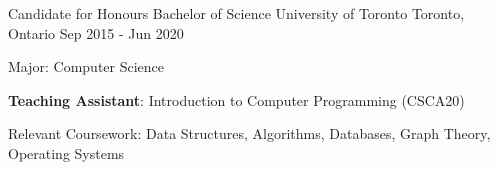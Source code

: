 
\begin{cventries}
  \cventry
    {Candidate for Honours Bachelor of Science}
    {University of Toronto}
    {Toronto, Ontario}
    {Sep 2015 - Jun 2020}
    {
      \begin{cvitems}
        \item {Major: Computer Science}
        \item {\textbf{Teaching Assistant}: Introduction to Computer Programming (CSCA20)}
        \item {Relevant Coursework: Data Structures, Algorithms, Databases, Graph Theory, Operating Systems}
      \end{cvitems}
    }
\end{cventries}
